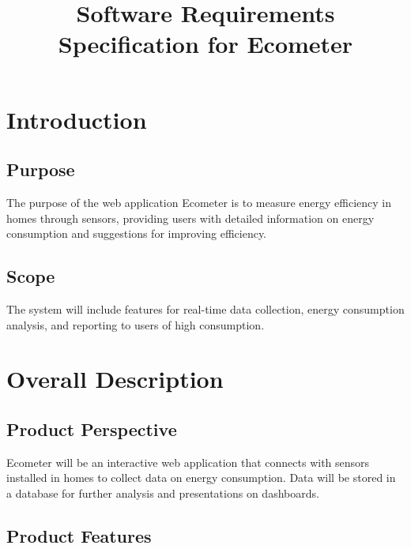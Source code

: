 \documentclass[conference]{IEEEtran}
\begin{document}
\title{Software Requirements Specification for Ecometer}

\author{
}

\maketitle

\section{Introduction}

\subsection{Purpose}
The purpose of the web application Ecometer is to measure energy efficiency in homes through sensors, providing users with detailed information on energy consumption and suggestions for improving efficiency.

\subsection{Scope}
The system will include features for real-time data collection, energy consumption analysis, and reporting to users of high consumption.

\section{Overall Description}

\subsection{Product Perspective}
Ecometer will be an interactive web application that connects with sensors installed in homes to collect data on energy consumption. Data will be stored in a database for further analysis and presentations on dashboards.

\subsection{Product Features}
\end{document}

